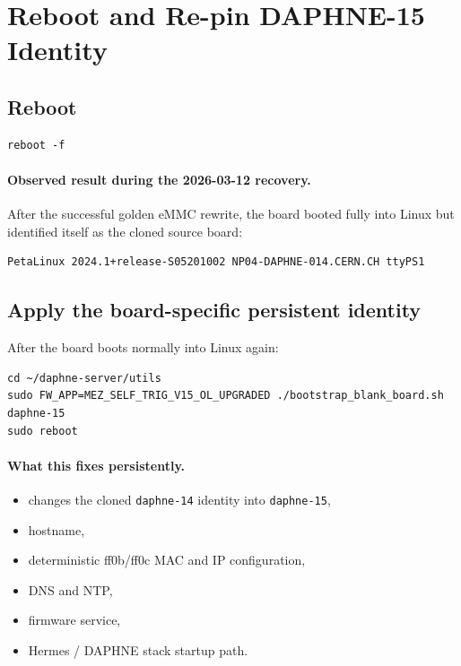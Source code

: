 \documentclass[a4paper,11pt]{article}
\begin{document}
\clearpage
\section{Reboot and Re-pin DAPHNE-15 Identity}

\subsection*{Reboot}
\begin{listing}[H]
\begin{verbatim}
reboot -f
\end{verbatim}
\caption{Reboot after eMMC rewrite}
\end{listing}

\paragraph{Observed result during the 2026-03-12 recovery.}
After the successful golden eMMC rewrite, the board booted fully into Linux but
identified itself as the cloned source board:
\begin{listing}[H]
\begin{verbatim}
PetaLinux 2024.1+release-S05201002 NP04-DAPHNE-014.CERN.CH ttyPS1
\end{verbatim}
\caption{Expected first boot before re-pinning daphne-15 identity}
\end{listing}

\subsection*{Apply the board-specific persistent identity}
After the board boots normally into Linux again:
\begin{listing}[H]
\begin{verbatim}
cd ~/daphne-server/utils
sudo FW_APP=MEZ_SELF_TRIG_V15_OL_UPGRADED ./bootstrap_blank_board.sh daphne-15
sudo reboot
\end{verbatim}
\caption{Install the persistent daphne-15 identity}
\end{listing}

\paragraph{What this fixes persistently.}
\begin{itemize}
  \item changes the cloned \texttt{daphne-14} identity into \texttt{daphne-15},
  \item hostname,
  \item deterministic ff0b/ff0c MAC and IP configuration,
  \item DNS and NTP,
  \item firmware service,
  \item Hermes / DAPHNE stack startup path.
\end{itemize}
\end{document}
